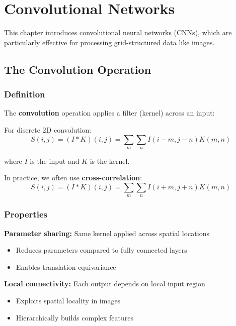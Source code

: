 
\chapter{Convolutional Networks}
\label{chap:convolutional-networks}

This chapter introduces convolutional neural networks (CNNs), which are particularly effective for processing grid-structured data like images.

\section{The Convolution Operation}
\label{sec:convolution}

\subsection{Definition}

The \textbf{convolution} operation applies a filter (kernel) across an input:

For discrete 2D convolution:
\begin{equation}
S(i,j) = (I * K)(i,j) = \sum_m \sum_n I(i-m, j-n) K(m, n)
\end{equation}

where $I$ is the input and $K$ is the kernel.

In practice, we often use \textbf{cross-correlation}:
\begin{equation}
S(i,j) = (I * K)(i,j) = \sum_m \sum_n I(i+m, j+n) K(m, n)
\end{equation}

\subsection{Properties}

\textbf{Parameter sharing:} Same kernel applied across spatial locations
\begin{itemize}
    \item Reduces parameters compared to fully connected layers
    \item Enables translation equivariance
\end{itemize}

\textbf{Local connectivity:} Each output depends on local input region
\begin{itemize}
    \item Exploits spatial locality in images
    \item Hierarchically builds complex features
\end{itemize}

